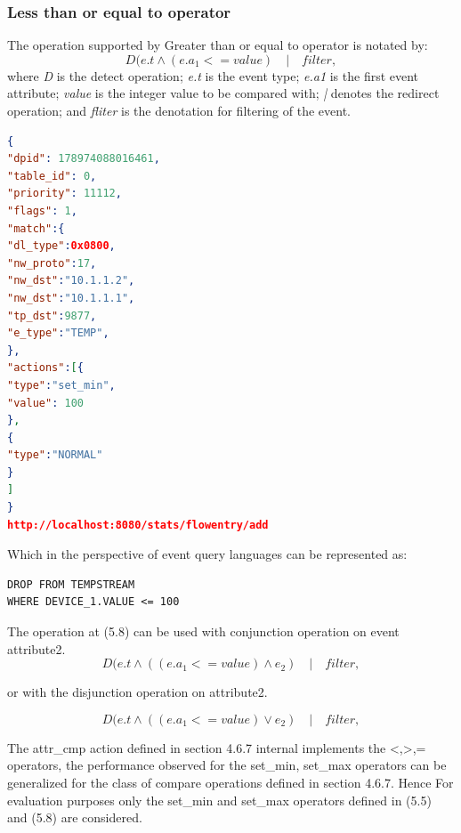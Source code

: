 \subsubsection{Less than or equal to operator}
The operation supported by Greater than or equal to operator is notated by:
\begin{equation}D(e.t  \wedge (e.a_1 <= value) \quad | \quad filter, \end{equation}
where \textit{D} is the detect operation; \newline
\textit{e.t} is the event type; \newline
\textit{e.a1} is the first event attribute; \newline
\textit{value} is the integer value to be compared with; \newline
\textit{|} denotes the redirect operation; \newline
and \textit{fliter} is the denotation for filtering of the event. \newline \newline
\begin{lstlisting}[language=json,firstnumber=1]
{
"dpid": 178974088016461,
"table_id": 0,
"priority": 11112,
"flags": 1,
"match":{
"dl_type":0x0800,
"nw_proto":17,
"nw_dst":"10.1.1.2",
"nw_dst":"10.1.1.1",
"tp_dst":9877,
"e_type":"TEMP",
},
"actions":[{
"type":"set_min",
"value": 100
},
{
"type":"NORMAL"
}
]
}
http://localhost:8080/stats/flowentry/add \end{lstlisting}

Which in the perspective of event query languages can be represented as:

\begin{verbatim}
DROP FROM TEMPSTREAM
WHERE DEVICE_1.VALUE <= 100
\end{verbatim}

The operation at (5.8) can be used with conjunction operation on event attribute2.
\begin{equation}D(e.t  \wedge ((e.a_1 <= value) \wedge e_2 )\quad | \quad filter, \end{equation}

or with the disjunction operation on attribute2.

\begin{equation}D(e.t  \wedge ((e.a_1 <= value) \vee e_2 )\quad | \quad filter, \end{equation}

The attr_cmp action defined in section 4.6.7 internal implements the {<,>,=} operators, the performance observed for the set_min, set_max operators can be generalized for the class of compare operations defined in section 4.6.7. Hence For evaluation purposes only the set_min and set_max operators defined in (5.5) and (5.8) are considered. 

